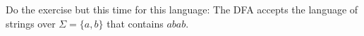   Do the exercise but this time for this language:
  The DFA accepts the language of strings over 
  $\Sigma = \{a, b\}$ that contains $abab$.
